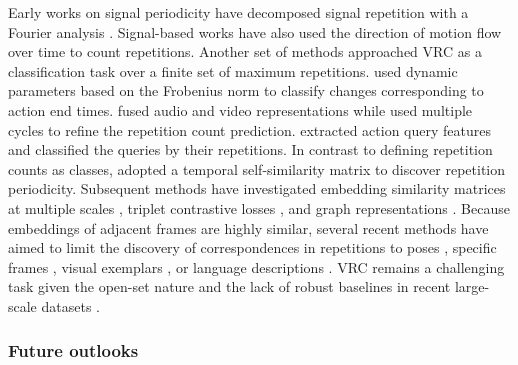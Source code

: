 Early works on signal periodicity  have decomposed signal repetition with a Fourier analysis . Signal-based works have also used the direction of motion flow over time  to count repetitions. Another set of methods approached VRC as a classification task over a finite set of maximum repetitions.  used dynamic parameters based on the Frobenius norm to classify changes corresponding to action end times.
 fused audio and video representations while  used multiple cycles to refine the repetition count prediction.  extracted action query features and classified the queries by their repetitions. In contrast to defining repetition counts as classes,  adopted a temporal self-similarity matrix  to discover repetition periodicity. Subsequent methods have investigated embedding similarity matrices at multiple scales , triplet contrastive losses , and graph representations . Because embeddings of adjacent frames are highly similar, several recent methods have aimed to limit the discovery of correspondences in repetitions to poses , specific frames , visual exemplars , or language descriptions . VRC remains a challenging task given the open-set nature and the lack of robust baselines in recent large-scale datasets .

\subsubsection{Future outlooks}
\label{sec:recognition::temporal:::outlooks}

